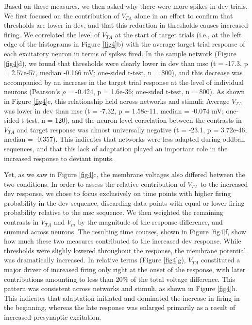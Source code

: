 \documentclass[pdflatex,referee,iicol,sn-basic]{sn-jnl}
\theoremstyle{thmstyleone}%
\theoremstyle{thmstyletwo}%
\theoremstyle{thmstylethree}%
\begin{document}
Based on these measures, we then asked why there were more spikes in dev trials. We first focused on the contribution of $V_{TA}$ alone in an effort to confirm that thresholds are lower in dev, and that this reduction in thresholds causes increased firing. We correlated the level of $V_{TA}$ at the start of target trials (i.e., at the left edge of the histograms in Figure \ref{fig4}b) with the average target trial response of each excitatory neuron in terms of spikes fired. In the sample network (Figure \ref{fig4}d), we found that thresholds were clearly lower in dev than msc (t = -17.3, p = 2.57e-57, median -0.166 mV; one-sided t-test, n = 800), and this decrease was accompanied by an increase in the target trial response at the level of individual neurons (Pearson's $\rho$ = -0.424, p = 1.6e-36; one-sided t-test, n = 800). As shown in Figure \ref{fig4}e, this relationship held across networks and stimuli: Average $V_{TA}$ was lower in dev than msc (t = -7.32, p = 1.58e-11, median = -0.074 mV; one-sided t-test, n = 120), and the neuron-level correlation between the contrasts in $V_{TA}$ and target response was almost universally negative (t = -23.1, p = 3.72e-46, median = -0.357). This indicates that networks were less adapted during oddball sequences, and that this lack of adaptation played an important role in the increased response to deviant inputs.

Yet, as we saw in Figure \ref{fig4}c, the membrane voltages also differed between the two conditions. In order to assess the relative contribution of $V_{TA}$ to the increased dev response, we chose to focus exclusively on time points with higher firing probability in the dev sequence, discarding data points with equal or lower firing probability relative to the msc sequence. We then weighted the remaining contrasts in $V_{TA}$ and $V_m$ by the magnitude of the response difference, and summed across neurons. The resulting time courses, shown in Figure \ref{fig4}f, show how much these two measures contributed to the increased dev response. While thresholds were slighly lowered throughout the response, the membrane potential was dramatically increased. In relative terms (Figure \ref{fig4}g), $V_{TA}$ constituted a major driver of increased firing only right at the onset of the response, with later contributions amounting to less than 20\% of the total voltage difference. This pattern was consistent across networks and stimuli, as shown in Figure \ref{fig4}h. This indicates that adaptation initiated and dominated the increase in firing in the beginning, whereas the late response was enlarged primarily as a result of increased presynaptic excitation.
\end{document}
